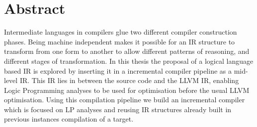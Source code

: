 \chapter{Abstract}

Intermediate languages in compilers glue two different compiler construction
phases. Being machine independent makes it possible for an IR structure to
transform from one form to another to allow different patterns of reasoning,
and different stages of transformation. In this thesis the proposal of a
logical language based IR is explored by inserting it in a incremental compiler
pipeline as a mid-level IR. This IR lies in between the source code and the
LLVM IR, enabling Logic Programming analyses to be used for optimisation before
the usual LLVM optimisation. Using this compilation pipeline we build an
incremental compiler which is focused on LP analyses and reusing IR structures
already built in previous instances compilation of a target.








